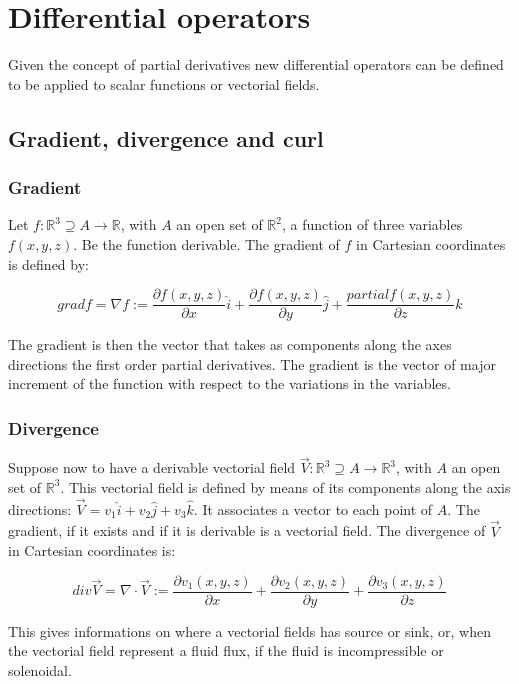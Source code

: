 \chapter{Differential operators}
Given the concept of partial derivatives new differential operators can be defined to be applied to scalar functions or vectorial fields.

\section{Gradient, divergence and curl}

	\subsection{Gradient}
	Let $f:\mathbb{R}^3\supseteq A\rightarrow\mathbb{R}$, with $A$ an open set of $\mathbb{R}^2$, a function of three variables $f(x,y,z)$.
	Be the function derivable.
	The gradient of $f$ in Cartesian coordinates is defined by:

	$$grad f = \nabla f := \frac{\partial f(x,y,z)}{\partial x}\hat{i} + \frac{\partial f(x,y,z)}{\partial y}\hat{j} + \frac{partial f(x,y,z)}{\partial z}\hat{k}$$

	The gradient is then the vector that takes as components along the axes directions the first order partial derivatives.
	The gradient is the vector of major increment of the function with respect to the variations in the variables.

	\subsection{Divergence}
	Suppose now to have a derivable vectorial field $\vec{V}:\mathbb{R}^3\supseteq A \rightarrow\mathbb{R}^3$, with $A$ an open set of $\mathbb{R}^3$.
	This vectorial field is defined by means of its components along the axis directions: $\vec{V} = v_1\hat{i} + v_2\hat{j} + v_3\hat{k}$.
	It associates a vector to each point of $A$.
	The gradient, if it exists and if it is derivable is a vectorial field.
	The divergence of $\vec{V}$ in Cartesian coordinates is:

	$$div\vec{V} = \nabla\cdot\vec{V} := \frac{\partial v_1(x,y,z)}{\partial x} + \frac{\partial v_2(x,y,z)}{\partial y} + \frac{\partial v_3(x,y,z)}{\partial z}$$

	This gives informations on where a vectorial fields has source or sink, or, when the vectorial field represent a fluid flux, if the fluid is incompressible or solenoidal.

